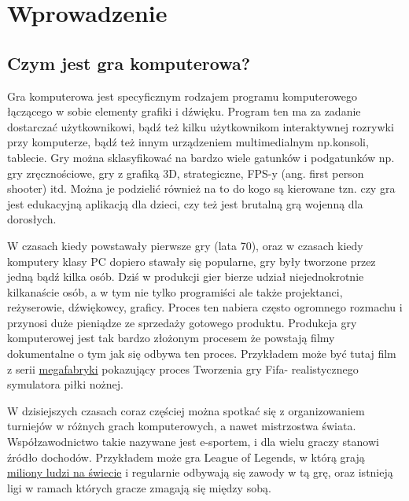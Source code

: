 \setcounter{secnumdepth}{3}
\renewcommand{\chaptername}{Rozdział}
\chapter{Wprowadzenie} 

\section{Czym jest gra komputerowa?}
\hspace{1cm} Gra komputerowa jest specyficznym rodzajem programu komputerowego łączącego w sobie elementy grafiki i dźwięku. Program ten ma za zadanie dostarczać użytkownikowi, bądź też kilku użytkownikom interaktywnej rozrywki przy komputerze, bądź też innym urządzeniem multimedialnym np.konsoli, tablecie. Gry można sklasyfikować na bardzo wiele gatunków i podgatunków np. gry zręcznościowe, gry z grafiką 3D, strategiczne, FPS-y (ang. first person shooter) itd. Można je podzielić również na to do kogo są kierowane tzn. czy gra jest edukacyjną aplikacją dla dzieci, czy też jest brutalną grą wojenną dla dorosłych.

W czasach kiedy powstawały pierwsze gry (lata 70), oraz w czasach kiedy komputery klasy PC dopiero stawały się popularne, gry były tworzone przez jedną bądź kilka osób. Dziś w produkcji gier bierze udział niejednokrotnie kilkanaście osób, a w tym nie tylko programiści ale także projektanci, reżyserowie, dźwiękowcy, graficy. 
Proces ten nabiera często ogromnego rozmachu i przynosi duże pieniądze ze sprzedaży gotowego produktu. Produkcja gry komputerowej jest tak bardzo złożonym procesem że powstają filmy dokumentalne o tym jak się odbywa ten proces. Przykładem może być tutaj film z serii \href{http://natgeotv.com/uk/megafactories/videos/ea-sports}{megafabryki} pokazujący proces Tworzenia gry Fifa- realistycznego symulatora piłki nożnej. 

W dzisiejszych czasach coraz częściej można spotkać się z organizowaniem turniejów w różnych grach komputerowych, a nawet mistrzostwa świata. Współzawodnictwo takie nazywane jest e-sportem, i dla wielu graczy stanowi źródło dochodów. Przykładem może gra League of Legends, w którą grają  \href{http://gamezilla.komputerswiat.pl/newsy/2012/41/league-of-legends-w-liczbach-przerazajaco-wysokich-liczbach}{miliony ludzi na świecie} i regularnie odbywają się zawody w tą grę, oraz istnieją ligi w ramach których gracze zmagają się między sobą.

